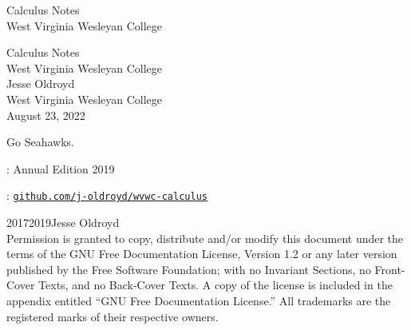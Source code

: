 \documentclass[twoside,10pt,]{book}
\newcommand{\titlepagefont}{\relax}
\newcommand{\mono}[1]{\texttt{#1}}
\numberwithin{equation}{part}
\begin{document}
\raggedbottom
\frontmatter
\thispagestyle{empty}
{\titlepagefont\centering
\vspace*{0.28\textheight}
{\Huge Calculus Notes}\\[2\baselineskip]
{\LARGE West Virginia Wesleyan College}\\
}
\clearpage
\thispagestyle{empty}
\null%
\clearpage
\thispagestyle{empty}
{\titlepagefont\centering
\vspace*{0.14\textheight}
{\Huge Calculus Notes}\\[\baselineskip]
{\LARGE West Virginia Wesleyan College}\\[3\baselineskip]
{\Large Jesse Oldroyd}\\[0.5\baselineskip]
{\Large West Virginia Wesleyan College}\\[3\baselineskip]
{\Large August 23, 2022}\\}
\clearpage
\thispagestyle{empty}
\hypertarget{x:colophon:front-colophon}{}\noindent
Go Seahawks.%
\par
{}
: Annual Edition 2019\par\medskip
{}: \href{https:\slash{}\slash{}github.com\slash{}j-oldroyd\slash{}wvwc-calculus}{\mono{github.com/j-oldroyd/wvwc-calculus}}\par\medskip
\noindent\textcopyright{}2017\textendash{}2019\quad{}Jesse Oldroyd\\[0.5\baselineskip]
Permission is granted to copy, distribute and\slash{}or modify this document under the terms of the GNU Free Documentation License, Version 1.2 or any later version published by the Free Software Foundation; with no Invariant Sections, no Front-Cover Texts, and no Back-Cover Texts.  A copy of the license is included in the appendix entitled ``GNU Free Documentation License.''  All trademarks\texttrademark{} are the registered\textregistered{} marks of their respective owners.\par\medskip
{}
\null\clearpage
%
%
\typeout{************************************************}
\end{document}
